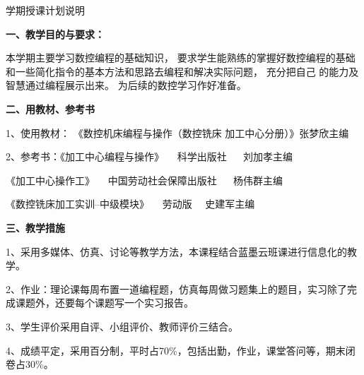 \documentclass{ctexart}
\begin{document}

\jhsy %

\begin{center}
 \heiti 学期授课计划说明
\end{center}
 \setlength{\parindent}{2em} \setlength{\baselineskip}{22pt}

\textbf{一、教学目的与要求：}

本学期主要学习数控编程的基础知识，
要求学生能熟练的掌握好数控编程的基础和一些简化指令的基本方法和思路去编程和解决实际问题，
充分把自己 的能力及智慧通过编程展示出来。
为后续的数控学习作好准备。

\textbf{二、用教材、参考书}

1、使用教材： 《数控机床编程与操作（数控铣床 加工中心分册）》张梦欣主编

2、参考书：《加工中心编程与操作》~~  科学出版社 ~~ 刘加孝主编

\hspace{5em}《加工中心操作工》~~ 中国劳动社会保障出版社 ~~ 杨伟群主编

\hspace{5em}《数控铣床加工实训--中级模块》 ~~劳动版 ~~史建军主编

\textbf{三、教学措施}

1、采用多媒体、仿真、讨论等教学方法，本课程结合蓝墨云班课进行信息化的教学。

2、作业：理论课每周布置一道编程题，仿真每周做习题集上的题目，实习除了完成课题外，还要每个课题写一个实习报告。

3、学生评价采用自评、小组评价、教师评价三结合。

4、成绩平定，采用百分制，平时占70\%，包括出勤，作业，课堂答问等，期末闭卷占30\%。
\end{document}
